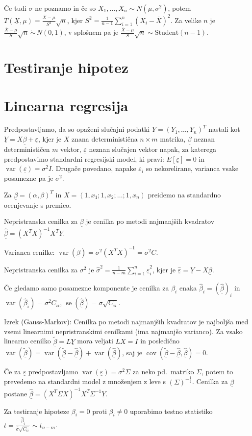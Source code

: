 \documentclass[11pt,a4paper]{amsart}
\theoremstyle{definition} %
\theoremstyle{plain} %
\newcommand{\X}{\underline{X}}
\newcommand{\Y}{\underline{Y}}
\newcommand{\ubeta}{\ensuremath{\underline{\beta}}}
\newcommand{\ueps}{\ensuremath{\underline{\varepsilon}}}
\DeclareMathOperator{\cov}{cov}
\DeclareMathOperator{\var}{var}
\DeclareMathOperator{\se}{se}
\begin{document}
Če tudi $\sigma$ ne poznamo in če so $X_1,\ldots, X_n \sim N(\mu, \sigma^2)$,
potem $T(\X ,\mu) = \frac{\overline{X} - \mu}{S^2}\sqrt{n}$, kjer $S^2 =
\frac{1}{n-1} \sum_{i=1}^n (X_i - \overline{X})^2$. Za velike $n$ je $
\frac{\overline{X} - \mu}{S}\sqrt{n} \,\dot{\sim}\, N(0,1)$, v splošnem pa je $
\frac{\overline{X} - \mu}{S}\sqrt{n} \sim \text{Student}(n-1).$

\section*{Testiranje hipotez}

\section*{Linearna regresija}
Predpostavljamo, da so opaženi slučajni podatki $\Y = (Y_1, \dots, Y_n)^T$ nastali kot
$\Y = X \ubeta + \ueps$, kjer je $X$ znana deterministična $n \times m$ matrika, $\ubeta$
neznan determinističen $m$ vektor, $\ueps$ neznan slučajen vektor napak, za katerega
predpostavimo standardni regresijski model, ki pravi: $E[\ueps] = 0$ in
$\var(\ueps) = \sigma^2 I$.  Drugače povedano, napake $\varepsilon_i$ so
nekorelirane, varianca vsake posamezne pa je $\sigma^2$.

Za $\ubeta = (\alpha, \beta)^T$ in $X = (1, x_1; 1, x_2; \dots; 1, x_n)$
preidemo na standardno ocenjevanje s premico.

Nepristranska cenilka za $\ubeta$ je cenilka po metodi najmanjših kvadratov
$\hat{\ubeta} = (X^TX)^{-1}X^TY$.

Varianca cenilke: $\var(\ubeta) = \sigma^2(X^TX)^{-1} = \sigma^2C$.

Nepristranska cenilka za $\sigma^2$ je $\hat{\sigma}^2 = \frac{1}{n-m}
\sum_{i=1}^n \hat{\ueps}_i^2$, kjer je $\hat{\ueps} = \Y - X\ubeta$.

Če gledamo samo posamezne komponente je cenilka za $\beta_i$ enaka
$\hat{\beta}_i = (\hat{\ubeta})_i$ in $\var(\hat{\beta}_i) = \sigma^2C_{ii}$,
$\se(\hat{\ubeta}) = \sigma \sqrt{C_{ii}}$.

Izrek (Gauss-Markov): Cenilka po metodi najmanjših kvadratov je najboljša med
vsemi linearnimi nepristranskimi cenilkami (ima najmanjšo varianco). Za vsako
linearno cenilko $\tilde{\ubeta} = L\Y$ mora veljati $LX = I$ in posledično
$\var(\tilde{\ubeta}) = \var(\tilde{\ubeta} - \hat{\ubeta}) +
\var(\hat{\ubeta})$, saj je $\cov(\tilde{\ubeta} - \hat{\ubeta}, \hat{\ubeta}) =
0$.

Če za $\ueps$ predpostavljamo $\var(\ueps) = \sigma^2\Sigma$ za neko pd.\
matriko $\Sigma$, potem to prevedemo na standardni model z množenjem z leve s
$(\Sigma)^{-\frac12}$. Cenilka za $\ubeta$ postane $\hat{\ubeta} =
(X^T\Sigma X)^{-1}X^T\Sigma^{-1} \Y$.

Za testiranje hipoteze $\beta_i = 0$ proti $\beta_i \neq 0$ uporabimo testno
statistiko $t = \frac{\hat{\ubeta}_i}{\hat{\sigma} \sqrt{C_{ii}}} \sim t_{n-m}$.
\end{document}
